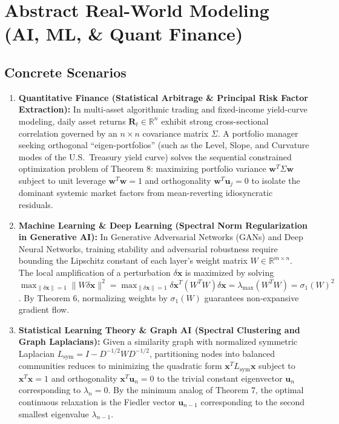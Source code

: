 \documentclass[11pt, letterpaper]{article}
\theoremstyle{definition}
\theoremstyle{remark}
\begin{document}
\newpage
\section{Abstract Real-World Modeling (AI, ML, \& Quant Finance)}

\subsection{Concrete Scenarios}
\begin{enumerate}[label=\textbf{\arabic*.}]
    \item \textbf{Quantitative Finance (Statistical Arbitrage \& Principal Risk Factor Extraction):}
    In multi-asset algorithmic trading and fixed-income yield-curve modeling, daily asset returns $\mathbf{R}_t \in \mathbb{R}^n$ exhibit strong cross-sectional correlation governed by an $n \times n$ covariance matrix $\Sigma$. A portfolio manager seeking orthogonal ``eigen-portfolios'' (such as the Level, Slope, and Curvature modes of the U.S.\ Treasury yield curve) solves the sequential constrained optimization problem of Theorem 8: maximizing portfolio variance $\mathbf{w}^T \Sigma \mathbf{w}$ subject to unit leverage $\mathbf{w}^T\mathbf{w} = 1$ and orthogonality $\mathbf{w}^T \mathbf{u}_j = 0$ to isolate the dominant systemic market factors from mean-reverting idiosyncratic residuals.
    \item \textbf{Machine Learning \& Deep Learning (Spectral Norm Regularization in Generative AI):}
    In Generative Adversarial Networks (GANs) and Deep Neural Networks, training stability and adversarial robustness require bounding the Lipschitz constant of each layer's weight matrix $W \in \mathbb{R}^{m \times n}$. The local amplification of a perturbation $\delta \mathbf{x}$ is maximized by solving $\max_{\|\delta \mathbf{x}\|=1} \|W \delta \mathbf{x}\|^2 = \max_{\|\delta \mathbf{x}\|=1} \delta \mathbf{x}^T (W^T W)\delta \mathbf{x} = \lambda_{\max}(W^T W) = \sigma_1(W)^2$. By Theorem 6, normalizing weights by $\sigma_1(W)$ guarantees non-expansive gradient flow.
    \item \textbf{Statistical Learning Theory \& Graph AI (Spectral Clustering and Graph Laplacians):}
    Given a similarity graph with normalized symmetric Laplacian $L_{\text{sym}} = I - D^{-1/2} W D^{-1/2}$, partitioning nodes into balanced communities reduces to minimizing the quadratic form $\mathbf{x}^T L_{\text{sym}} \mathbf{x}$ subject to $\mathbf{x}^T\mathbf{x} = 1$ and orthogonality $\mathbf{x}^T \mathbf{u}_n = 0$ to the trivial constant eigenvector $\mathbf{u}_n$ corresponding to $\lambda_n = 0$. By the minimum analog of Theorem 7, the optimal continuous relaxation is the Fiedler vector $\mathbf{u}_{n-1}$ corresponding to the second smallest eigenvalue $\lambda_{n-1}$.
\end{enumerate}
\end{document}
